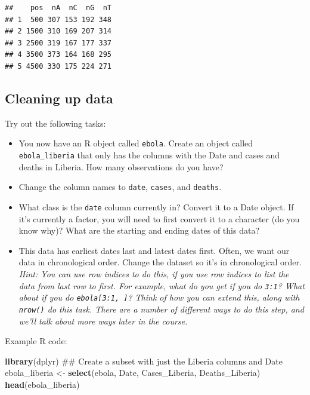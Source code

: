 \documentclass[]{book}
\makeatletter
\newenvironment{Shaded}{\begin{snugshade}}{\end{snugshade}}
\newcommand{\KeywordTok}[1]{\textcolor[rgb]{0.13,0.29,0.53}{\textbf{#1}}}
\newcommand{\StringTok}[1]{\textcolor[rgb]{0.31,0.60,0.02}{#1}}
\newcommand{\NormalTok}[1]{#1}
\providecommand{\tightlist}{%
  \setlength{\itemsep}{0pt}\setlength{\parskip}{0pt}}
\newenvironment{kframe}{%
\medskip{}
\setlength{\fboxsep}{.8em}
 \def\at@end@of@kframe{}%
 \ifinner\ifhmode%
  \def\at@end@of@kframe{\end{minipage}}%
  \begin{minipage}{\columnwidth}%
 \fi\fi%
 \def\FrameCommand##1{\hskip\@totalleftmargin \hskip-\fboxsep
 \colorbox{shadecolor}{##1}\hskip-\fboxsep
     \hskip-\linewidth \hskip-\@totalleftmargin \hskip\columnwidth}%
 \MakeFramed {\advance\hsize-\width
   \@totalleftmargin\z@ \linewidth\hsize
   \@setminipage}}%
 {\par\unskip\endMakeFramed%
 \at@end@of@kframe}
\renewenvironment{Shaded}{\begin{kframe}}{\end{kframe}}
\theoremstyle{definition}
\theoremstyle{definition}
\theoremstyle{definition}
\theoremstyle{remark}
\makeatother
\begin{document}
\begin{verbatim}
##    pos  nA  nC  nG  nT
## 1  500 307 153 192 348
## 2 1500 310 169 207 314
## 3 2500 319 167 177 337
## 4 3500 373 164 168 295
## 5 4500 330 175 224 271
\end{verbatim}

\subsection{Cleaning up data}\label{cleaning-up-data}

Try out the following tasks:

\begin{itemize}
\tightlist
\item
  You now have an R object called \texttt{ebola}. Create an object
  called \texttt{ebola\_liberia} that only has the columns with the Date
  and cases and deaths in Liberia. How many observations do you have?
\item
  Change the column names to \texttt{date}, \texttt{cases}, and
  \texttt{deaths}.
\item
  What class is the \texttt{date} column currently in? Convert it to a
  Date object. If it's currently a factor, you will need to first
  convert it to a character (do you know why)? What are the starting and
  ending dates of this data?
\item
  This data has earliest dates last and latest dates first. Often, we
  want our data in chronological order. Change the dataset so it's in
  chronological order. \emph{Hint: You can use row indices to do this,
  if you use row indices to list the data from last row to first. For
  example, what do you get if you do \texttt{3:1}? What about if you do
  \texttt{ebola{[}3:1,\ {]}}? Think of how you can extend this, along
  with \texttt{nrow()} do this task. There are a number of different
  ways to do this step, and we'll talk about more ways later in the
  course.}
\end{itemize}

Example R code:

\begin{Shaded}
\begin{Highlighting}[]
\KeywordTok{library}\NormalTok{(dplyr)}
\NormalTok{## Create a subset with just the Liberia columns and Date}
\NormalTok{ebola_liberia <-}\StringTok{ }\KeywordTok{select}\NormalTok{(ebola, Date, Cases_Liberia, Deaths_Liberia)}
\KeywordTok{head}\NormalTok{(ebola_liberia)}
\end{Highlighting}
\end{Shaded}
\end{document}
